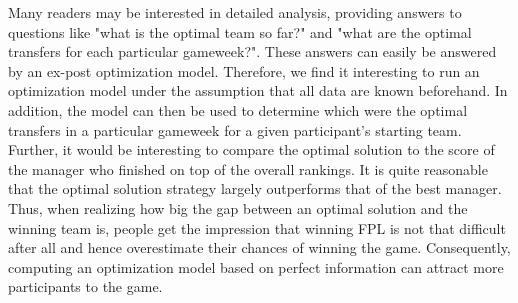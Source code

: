 
\newpar

Many readers may be interested in detailed analysis, providing answers to questions like "what is the optimal team so far?" and "what are the optimal transfers for each particular gameweek?". These answers can easily be answered by an ex-post optimization model. Therefore, we find it interesting to run an optimization model under the assumption that all data are known beforehand. In addition, the model can then be used to determine which were the optimal transfers in a particular gameweek for a given participant's starting team. Further, it would be interesting to compare the optimal solution to the score of the manager who finished on top of the overall rankings. It is quite reasonable that the optimal solution strategy largely outperforms that of the best manager. Thus, when realizing how big the gap between an optimal solution and the winning team is, people get the impression that winning FPL is not that difficult after all and hence overestimate their chances of winning the game. Consequently, computing an optimization model based on perfect information can attract more participants to the game.

